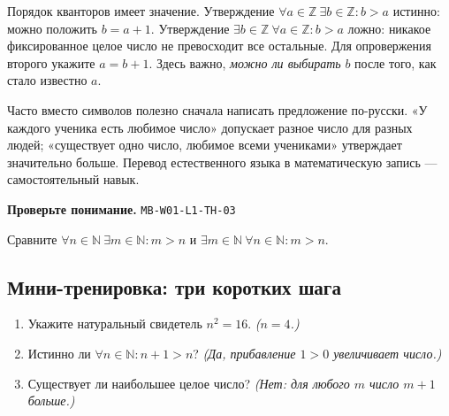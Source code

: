 \documentclass[11pt,a4paper,openany]{book}
\newcommand{\muid}[1]{\texttt{\footnotesize #1}}
\begin{document}
Порядок кванторов имеет значение. Утверждение $\forall a\in\mathbb Z\ \exists b\in\mathbb Z\colon b>a$ истинно: можно положить $b=a+1$. Утверждение $\exists b\in\mathbb Z\ \forall a\in\mathbb Z\colon b>a$ ложно: никакое фиксированное целое число не превосходит все остальные. Для опровержения второго укажите $a=b+1$. Здесь важно, \emph{можно ли выбирать} $b$ после того, как стало известно $a$.


Часто вместо символов полезно сначала написать предложение по-русски. «У каждого ученика есть любимое число» допускает разное число для разных людей; «существует одно число, любимое всеми учениками» утверждает значительно больше. Перевод естественного языка в математическую запись — самостоятельный навык.


\begin{center}
\end{center}

\begin{learnbox}\textbf{Проверьте понимание.} \muid{MB-W01-L1-TH-03}\par Сравните $\forall n\in\mathbb N\ \exists m\in\mathbb N\colon m>n$ и $\exists m\in\mathbb N\ \forall n\in\mathbb N\colon m>n$.\end{learnbox}

\subsection*{Мини-тренировка: три коротких шага}
\begin{enumerate}[label=\arabic*),leftmargin=*,itemsep=3pt]

\item Укажите натуральный свидетель $n^2=16$. \textit{($n=4$.)}

\item Истинно ли $\forall n\in\mathbb N\colon n+1>n$? \textit{(Да, прибавление $1>0$ увеличивает число.)}

\item Существует ли наибольшее целое число? \textit{(Нет: для любого $m$ число $m+1$ больше.)}

\end{enumerate}
\end{document}
